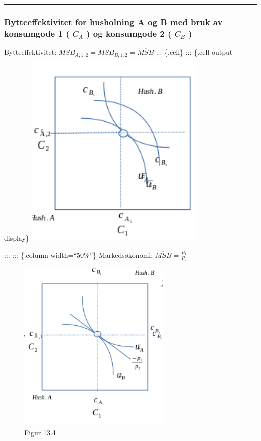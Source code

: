 \documentclass[
  letterpaper,
  DIV=11,
  numbers=noendperiod]{scrartcl}
\begin{document}
\begin{center}\rule{0.5\linewidth}{0.5pt}\end{center}

\subsubsection{\texorpdfstring{Bytteeffektivitet for husholning A og B
med bruk av konsumgode 1 ( \(C_A\) ) og konsumgode 2 ( \(C_B\)
)}{Bytteeffektivitet for husholning A og B med bruk av konsumgode 1 ( C\_A ) og konsumgode 2 ( C\_B )}}\label{bytteeffektivitet-for-husholning-a-og-b-med-bruk-av-konsumgode-1-c_a-og-konsumgode-2-c_b}

Bytteeffektivitet: \(MSB_{A,1,2}=MSB_{B,1,2}=\overline{MSB}\) :::
\{.cell\} ::: \{.cell-output-display\}
\includegraphics[width=0.65\textwidth,height=\textheight]{drawio/bytte_eff.png}

::: ::: \{.column width=``50\%''\} Markedsøkonomi:
\(\overline{MSB}=\frac{P_1}{P_2}\)

\begin{figure}[H]

{\centering \includegraphics[width=0.65\textwidth,height=\textheight]{drawio/bytte_eff_m.png}

}

\caption{Figur 13.4}

\end{figure}%
\end{document}
